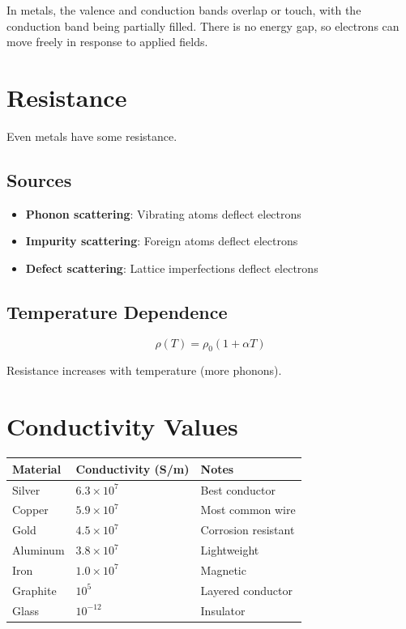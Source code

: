\documentclass[
  11pt,
  letterpaper,
  twoside,
  openright]{book}
\providecommand{\tightlist}{%
  \setlength{\itemsep}{0pt}\setlength{\parskip}{0pt}}
\begin{document}
In metals, the valence and conduction bands overlap or touch, with the
conduction band being partially filled. There is no energy gap, so
electrons can move freely in response to applied fields.

\section{Resistance}\label{resistance}

Even metals have some resistance.

\subsection{Sources}\label{sources}

\begin{itemize}
\tightlist
\item
  \textbf{Phonon scattering}: Vibrating atoms deflect electrons
\item
  \textbf{Impurity scattering}: Foreign atoms deflect electrons
\item
  \textbf{Defect scattering}: Lattice imperfections deflect electrons
\end{itemize}

\subsection{Temperature Dependence}\label{temperature-dependence}

\[
\rho(T) = \rho_0 (1 + \alpha T)
\]

Resistance increases with temperature (more phonons).

\section{Conductivity Values}\label{conductivity-values}

\begin{longtable}[]{@{}lll@{}}
\toprule\noalign{}
Material & Conductivity (S/m) & Notes \\
\midrule\noalign{}
\endhead
\bottomrule\noalign{}
\endlastfoot
Silver & \(6.3 \times 10^7\) & Best conductor \\
Copper & \(5.9 \times 10^7\) & Most common wire \\
Gold & \(4.5 \times 10^7\) & Corrosion resistant \\
Aluminum & \(3.8 \times 10^7\) & Lightweight \\
Iron & \(1.0 \times 10^7\) & Magnetic \\
Graphite & \(10^5\) & Layered conductor \\
Glass & \(10^{-12}\) & Insulator \\
\end{longtable}
\end{document}
